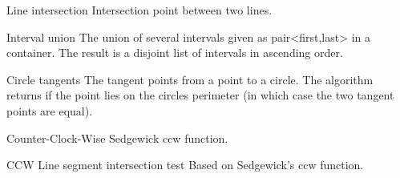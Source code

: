 




\begin{algorithm}{Line intersection}
\desc
Intersection point between two lines.
\end{algorithm}

\begin{algorithm}{Interval union}
\desc
The union of several intervals given as pair<first,last> in a container. The
result is a disjoint list of intervals in ascending order.
\end{algorithm}


\begin{algorithm}{Circle tangents}
\desc
The tangent points from a point to a circle. The algorithm returns if
the point lies on the circles perimeter (in which case the two tangent
points are equal).
\end{algorithm}


\begin{algorithm}{Counter-Clock-Wise}
\desc
Sedgewick ccw function.
\end{algorithm}

\begin{algorithm}{CCW Line segment intersection test}
\desc
Based on Sedgewick's ccw function.
\end{algorithm}


